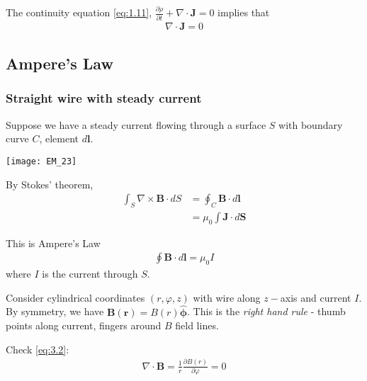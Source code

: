 \documentclass[a4paper]{article}
\begin{document}
The continuity equation \eqref{eq:1.11}, $\frac{\partial \rho}{\partial t} + \nabla \cdot \mathbf{J} = 0$ implies that
\begin{equation*}\tag{3.3} \label{eq:3.3}
\begin{aligned}
\nabla \cdot \mathbf{J} = 0
\end{aligned}
\end{equation*}

\subsection{Ampere's Law}

\subsubsection{Straight wire with steady current}
Suppose we have a steady current flowing through a surface $S$ with boundary curve $C$, element $d\mathbf{l}$. 

\texttt{[image: EM\_23]}

By Stokes' theorem,
\begin{equation*}
\begin{aligned}
\int_S \nabla \times \mathbf{B} \cdot dS &= \oint_C \mathbf{B} \cdot d\mathbf{l}\\
&= \mu_0 \int \mathbf{J} \cdot d\mathbf{S}
\end{aligned}
\end{equation*}

This is Ampere's Law
\begin{equation*}\tag{3.4} \label{eq:3.4}
\begin{aligned}
\oint \mathbf{B} \cdot d\mathbf{l} = \mu_0 I
\end{aligned}
\end{equation*}
where $I$ is the current through $S$.

Consider cylindrical coordinates $(r,\varphi,z)$ with wire along $z-$axis and current $I$. By symmetry, we have $\mathbf{B}(\mathbf{r}) = B(r) \hat{\mathbf{\phi}}$. This is the \emph{right hand rule} - thumb points along current, fingers around $B$ field lines. 

Check \eqref{eq:3.2}:
\begin{equation*}
\begin{aligned}
\nabla \cdot \mathbf{B} = \frac{1}{r}\frac{\partial B(r)}{\partial \varphi} = 0
\end{aligned}
\end{equation*}
\end{document}
